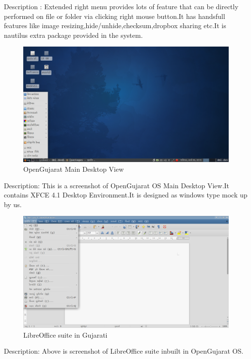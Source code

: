Description : Extended right menu provides lots of feature that can be directly performed on file or folder via clicking right mouse button.It has handsfull features like image resizing,hide/unhide,checksum,dropbox sharing etc.It is nautilus extra package provided in the system.
\newpage
\begin{figure}[h]
\begin{center}
  \includegraphics[scale=0.35] {10.png}
  \caption[Screenshot - OpenGujarat Main Desktop]{OpenGujarat Main Desktop View}
\end{center}
\end{figure}
Description: This is a screenshot of OpenGujarat OS Main Desktop View.It contains XFCE 4.1 Desktop Environment.It is designed as windows type mock up by us.
\newpage


\begin{figure}[h]
\begin{center}
  \includegraphics[scale=0.35] {11.png}
  \caption[Screenshot - Office suite in Gujarati]{LibreOffice suite in Gujarati}
\end{center}
\end{figure}
Description: Above is screenshot of LibreOffice suite inbuilt in OpenGujarat OS.

